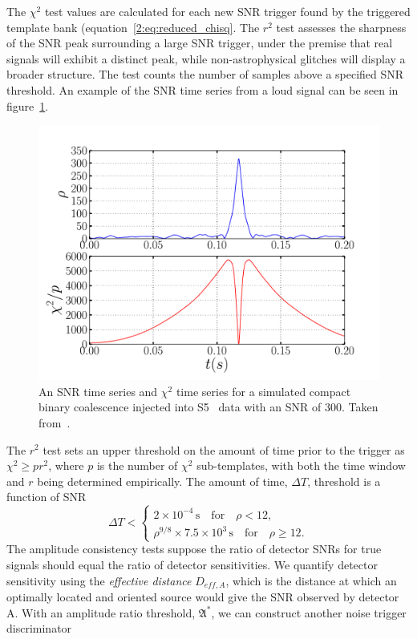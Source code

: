 The $\chi^{2}$ test values are calculated for each new SNR trigger found by the triggered template bank (equation~\ref{2:eq:reduced_chisq}. The \( r^{2} \) test assesses the sharpness of the SNR peak surrounding a large SNR trigger, under the premise that real \gwadj signals will exhibit a distinct peak, while non-astrophysical glitches will display a broader structure. The test counts the number of samples above a specified SNR threshold. An example of the SNR time series from a loud signal can be seen in figure~\ref{2:fig:ihope-snr-timeseries}.
%
\begin{figure}
    \centering
    \includegraphics[width=0.75\linewidth]{images/2_searches/ihope_snr_timeseries.pdf}
    \caption{An SNR time series and $\chi^{2}$ time series for a simulated compact binary coalescence injected into S5~\cite{S5:2012} data with an SNR of $300$. Taken from~\cite{IHOPE:2012zx}.}
    \label{2:fig:ihope-snr-timeseries}
\end{figure}
%
The \( r^{2} \) test sets an upper threshold on the amount of time prior to the trigger as \(\chi^{2} \ge p r^{2}\), where \( p \) is the number of \(\chi^{2}\) sub-templates, with both the time window and \( r \) being determined empirically. The amount of time, $\Delta T$, threshold is a function of SNR
%
\begin{equation}
    \Delta T < 
    \begin{cases}
        2 \times 10^{-4} \, \text{s} \quad \text{for} \quad \rho < 12, \\
        \rho^{9/8} \times 7.5 \times 10^{3} \, \text{s} \quad \text{for} \quad \rho \ge 12.
    \end{cases}
\end{equation}
%
The amplitude consistency tests suppose the ratio of detector SNRs for true \gwadj signals should equal the ratio of detector sensitivities. We quantify detector sensitivity using the \textit{effective distance} $D_{eff, A}$, which is the distance at which an optimally located and oriented source would give the SNR observed by detector A. With an amplitude ratio threshold, $\mathfrak{A}^{*}$, we can construct another noise trigger discriminator
